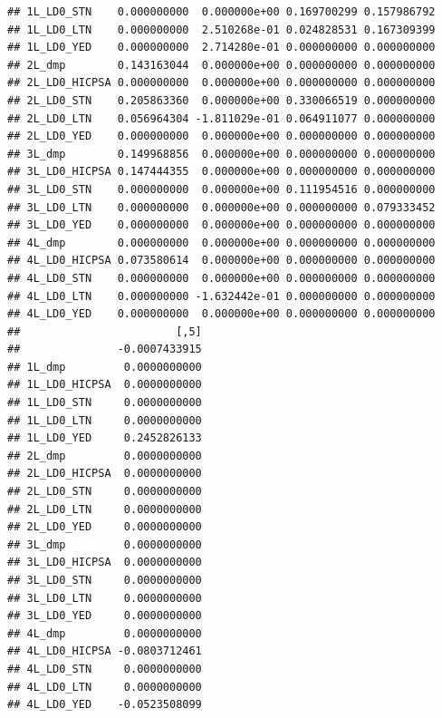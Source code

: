 \documentclass[11pt,oneside, a4paper]{amsart}\usepackage[]{graphicx}\usepackage[]{color}
\makeatletter
\newenvironment{kframe}{%
 \def\at@end@of@kframe{}%
 \ifinner\ifhmode%
  \def\at@end@of@kframe{\end{minipage}}%
  \begin{minipage}{\columnwidth}%
 \fi\fi%
 \def\FrameCommand##1{\hskip\@totalleftmargin \hskip-\fboxsep
 \colorbox{shadecolor}{##1}\hskip-\fboxsep
     \hskip-\linewidth \hskip-\@totalleftmargin \hskip\columnwidth}%
 \MakeFramed {\advance\hsize-\width
   \@totalleftmargin\z@ \linewidth\hsize
   \@setminipage}}%
 {\par\unskip\endMakeFramed%
 \at@end@of@kframe}
\newenvironment{knitrout}{}{} %
\makeatother
\begin{document}
\begin{knitrout}
\begin{kframe}
\begin{verbatim}
## 1L_LD0_STN    0.000000000  0.000000e+00 0.169700299 0.157986792
## 1L_LD0_LTN    0.000000000  2.510268e-01 0.024828531 0.167309399
## 1L_LD0_YED    0.000000000  2.714280e-01 0.000000000 0.000000000
## 2L_dmp        0.143163044  0.000000e+00 0.000000000 0.000000000
## 2L_LD0_HICPSA 0.000000000  0.000000e+00 0.000000000 0.000000000
## 2L_LD0_STN    0.205863360  0.000000e+00 0.330066519 0.000000000
## 2L_LD0_LTN    0.056964304 -1.811029e-01 0.064911077 0.000000000
## 2L_LD0_YED    0.000000000  0.000000e+00 0.000000000 0.000000000
## 3L_dmp        0.149968856  0.000000e+00 0.000000000 0.000000000
## 3L_LD0_HICPSA 0.147444355  0.000000e+00 0.000000000 0.000000000
## 3L_LD0_STN    0.000000000  0.000000e+00 0.111954516 0.000000000
## 3L_LD0_LTN    0.000000000  0.000000e+00 0.000000000 0.079333452
## 3L_LD0_YED    0.000000000  0.000000e+00 0.000000000 0.000000000
## 4L_dmp        0.000000000  0.000000e+00 0.000000000 0.000000000
## 4L_LD0_HICPSA 0.073580614  0.000000e+00 0.000000000 0.000000000
## 4L_LD0_STN    0.000000000  0.000000e+00 0.000000000 0.000000000
## 4L_LD0_LTN    0.000000000 -1.632442e-01 0.000000000 0.000000000
## 4L_LD0_YED    0.000000000  0.000000e+00 0.000000000 0.000000000
##                        [,5]
##               -0.0007433915
## 1L_dmp         0.0000000000
## 1L_LD0_HICPSA  0.0000000000
## 1L_LD0_STN     0.0000000000
## 1L_LD0_LTN     0.0000000000
## 1L_LD0_YED     0.2452826133
## 2L_dmp         0.0000000000
## 2L_LD0_HICPSA  0.0000000000
## 2L_LD0_STN     0.0000000000
## 2L_LD0_LTN     0.0000000000
## 2L_LD0_YED     0.0000000000
## 3L_dmp         0.0000000000
## 3L_LD0_HICPSA  0.0000000000
## 3L_LD0_STN     0.0000000000
## 3L_LD0_LTN     0.0000000000
## 3L_LD0_YED     0.0000000000
## 4L_dmp         0.0000000000
## 4L_LD0_HICPSA -0.0803712461
## 4L_LD0_STN     0.0000000000
## 4L_LD0_LTN     0.0000000000
## 4L_LD0_YED    -0.0523508099
\end{verbatim}
\end{kframe}
\end{knitrout}
\end{document}

